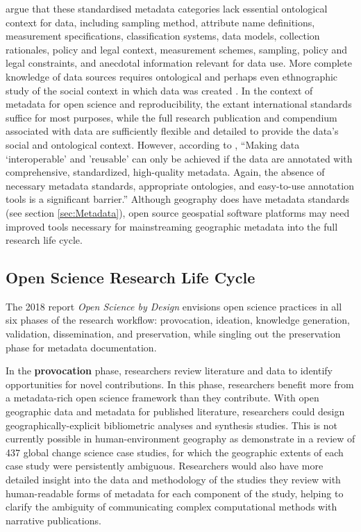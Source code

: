 \documentclass{isprs} %
\begin{document}
\citet{Schuurman2006} argue that these standardised metadata categories lack essential ontological context for data, including sampling method, attribute name definitions, measurement specifications, classification systems, data models, collection rationales, policy and legal context, measurement schemes, sampling, policy and legal constraints, and anecdotal information relevant for data use.
More complete knowledge of data sources requires ontological and perhaps even ethnographic study of the social context in which data was created \citep{Schuurman2008}.
In the context of metadata for open science and reproducibility, the extant international standards suffice for most purposes, while the full research publication and compendium associated with data are sufficiently flexible and detailed to provide the data's social and ontological context.
However, according to \citet[137-8]{NASEM2018}, ``Making data `interoperable' and 'reusable' can only be achieved if the data are annotated with comprehensive, standardized, high-quality metadata. Again, the absence of necessary metadata standards, appropriate ontologies, and easy-to-use annotation tools is a significant barrier.''
Although geography does have metadata standards (see section \ref{sec:Metadata}), open source geospatial software platforms may need improved tools necessary for mainstreaming geographic metadata into the full research life cycle.

\subsection{Open Science Research Life Cycle}\label{sec:lifecycle}

The 2018 \citeauthor{NASEM2018} report \textit{Open Science by Design} envisions open science practices in all six phases of the research workflow: provocation, ideation, knowledge generation, validation, dissemination, and preservation, while singling out the preservation phase for metadata documentation.

In the \textbf{provocation} phase, researchers review literature and data to identify opportunities for novel contributions.
In this phase, researchers benefit more from a metadata-rich open science framework than they contribute.
With open geographic data and metadata for published literature, researchers could design geographically-explicit bibliometric analyses and synthesis studies.
This is not currently possible in human-environment geography as \citet{Margulies2016} demonstrate in a review of 437 global change science case studies, for which the geographic extents of each case study were persistently ambiguous. 
Researchers would also have more detailed insight into the data and methodology of the studies they review with human-readable forms of metadata for each component of the study, helping to clarify the ambiguity of communicating complex computational methods with narrative publications.
\end{document}
